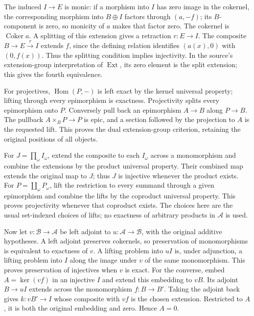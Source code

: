 The induced \(I\to E\) is monic: if a morphism into \(I\) has zero image in the cokernel, the corresponding morphism into \(B\oplus I\) factors through \((a,-f)\); its \(B\)-component is zero, so monicity of \(a\) makes that factor zero. The cokernel is \(\operatorname{Coker}a\). A splitting of this extension gives a retraction \(r:E\to I\). The composite \(B\to E\xrightarrow r I\) extends \(f\), since the defining relation identifies \((a(x),0)\) with \((0,f(x))\). Thus the splitting condition implies injectivity. In the source's extension-group interpretation of \(\operatorname{Ext}\), its zero element is the split extension; this gives the fourth equivalence.

For projectives, \(\operatorname{Hom}(P,-)\) is left exact by the kernel universal property; lifting through every epimorphism is exactness. Projectivity splits every epimorphism onto \(P\). Conversely pull back an epimorphism \(A\to B\) along \(P\to B\). The pullback \(A\times_B P\to P\) is epic, and a section followed by the projection to \(A\) is the requested lift. This proves the dual extension-group criterion, retaining the original positions of all objects.

For \(J=\prod_\omega I_\omega\), extend the composite to each \(I_\omega\) across a monomorphism and combine the extensions by the product universal property. Their combined map extends the original map to \(J\); thus \(J\) is injective whenever the product exists. For \(P=\coprod_\omega P_\omega\), lift the restriction to every summand through a given epimorphism and combine the lifts by the coproduct universal property. This proves projectivity whenever that coproduct exists. The choices here are the usual set-indexed choices of lifts; no exactness of arbitrary products in \(\mathcal A\) is used.

Now let \(v:\mathcal B\to\mathcal A\) be left adjoint to \(u:\mathcal A\to\mathcal B\), with the original additive hypotheses. A left adjoint preserves cokernels, so preservation of monomorphisms is equivalent to exactness of \(v\). A lifting problem into \(uI\) is, under adjunction, a lifting problem into \(I\) along the image under \(v\) of the same monomorphism. This proves preservation of injectives when \(v\) is exact. For the converse, embed \(A=\ker(vf)\) in an injective \(I\) and extend this embedding to \(vB\). Its adjoint \(B\to uI\) extends across the monomorphism \(f:B\to B'\). Taking the adjoint back gives \(k:vB'\to I\) whose composite with \(vf\) is the chosen extension. Restricted to \(A\), it is both the original embedding and zero. Hence \(A=0\).

